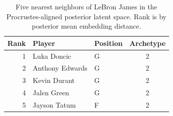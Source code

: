 \begin{table}[htbp]
  \centering\small
  \begin{tabular}{rllc}
    \toprule
    Rank & Player & Position & Archetype \\
    \midrule
    1 & Luka Doncic & G & 2 \\
    2 & Anthony Edwards & G & 2 \\
    3 & Kevin Durant & G & 2 \\
    4 & Jalen Green & G & 2 \\
    5 & Jayson Tatum & F & 2 \\
    \bottomrule
  \end{tabular}
  \caption{Five nearest neighbors of LeBron James in the Procrustes-aligned posterior latent space. Rank is by posterior mean embedding distance.}
  \label{tab:LeBron_James_neighbors}
\end{table}

